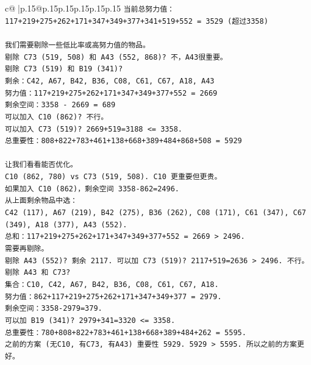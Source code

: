 \documentclass{article}
\begin{document}
{\begin{supertabular}{c@{$\;$}|p{.15\linewidth}@{}p{.15\linewidth}p{.15\linewidth}p{.15\linewidth}p{.15\linewidth}p{.15\linewidth}}
{{{\texttt{当前总努力值：117+219+275+262+171+347+349+377+341+519+552 = 3529 (超过3358)} \\
\\ 
\texttt{我们需要剔除一些低比率或高努力值的物品。} \\
\texttt{剔除 C73 (519, 508) 和 A43 (552, 868)? 不，A43很重要。} \\
\texttt{剔除 C73 (519) 和 B19 (341)?} \\
\texttt{剩余：C42, A67, B42, B36, C08, C61, C67, A18, A43} \\
\texttt{努力值：117+219+275+262+171+347+349+377+552 = 2669} \\
\texttt{剩余空间：3358 {-} 2669 = 689} \\
\texttt{可以加入 C10 (862)? 不行。} \\
\texttt{可以加入 C73 (519)? 2669+519=3188 <= 3358.} \\
\texttt{总重要性：808+822+783+461+138+668+389+484+868+508 = 5929} \\
\\ 
\texttt{让我们看看能否优化。} \\
\texttt{C10 (862, 780) vs C73 (519, 508). C10 更重要但更贵。} \\
\texttt{如果加入 C10 (862)，剩余空间 3358{-}862=2496.} \\
\texttt{从上面剩余物品中选：} \\
\texttt{C42 (117), A67 (219), B42 (275), B36 (262), C08 (171), C61 (347), C67 (349), A18 (377), A43 (552).} \\
\texttt{总和：117+219+275+262+171+347+349+377+552 = 2669 > 2496.} \\
\texttt{需要再剔除。} \\
\texttt{剔除 A43 (552)? 剩余 2117. 可以加 C73 (519)? 2117+519=2636 > 2496. 不行。} \\
\texttt{剔除 A43 和 C73?} \\
\texttt{集合：C10, C42, A67, B42, B36, C08, C61, C67, A18.} \\
\texttt{努力值：862+117+219+275+262+171+347+349+377 = 2979.} \\
\texttt{剩余空间：3358{-}2979=379.} \\
\texttt{可以加 B19 (341)? 2979+341=3320 <= 3358.} \\
\texttt{总重要性：780+808+822+783+461+138+668+389+484+262 = 5595.} \\
\texttt{之前的方案 (无C10, 有C73, 有A43) 重要性 5929. 5929 > 5595. 所以之前的方案更好。} \\
\\ 
}}}
\end{supertabular}}
\end{document}
